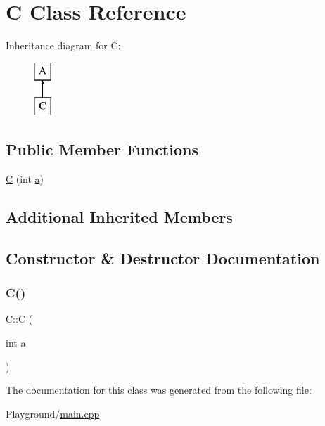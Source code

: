 \hypertarget{class_c}{}\section{C Class Reference}
\label{class_c}
Inheritance diagram for C\+:\begin{figure}[H]
\begin{center}
\leavevmode
\includegraphics[height=2.000000cm]{class_c}
\end{center}
\end{figure}
\subsection*{Public Member Functions}
\begin{DoxyCompactItemize}
\item 
\mbox{\hyperlink{class_c_a16ec3b6fcac532166d6fb2420e3558ab}{C}} (int \mbox{\hyperlink{class_a_a49a53415abd8f1b26235579cc805a15f}{a}})
\end{DoxyCompactItemize}
\subsection*{Additional Inherited Members}


\subsection{Constructor \& Destructor Documentation}
\mbox{\label{class_c_a16ec3b6fcac532166d6fb2420e3558ab}} 
\subsubsection{\texorpdfstring{C()}{C()}}
{\footnotesize\ttfamily C\+::C (\begin{DoxyParamCaption}\item[{int}]{a }\end{DoxyParamCaption})\hspace{0.3cm}{\ttfamily [inline]}}



The documentation for this class was generated from the following file\+:\begin{DoxyCompactItemize}
\item 
Playground/\mbox{\hyperlink{_playground_2main_8cpp}{main.\+cpp}}\end{DoxyCompactItemize}
